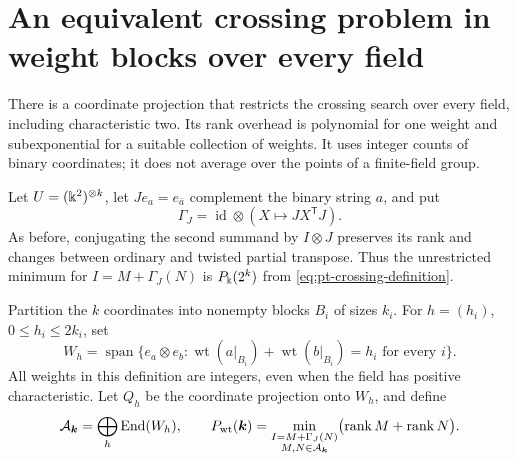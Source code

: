 \section{An equivalent crossing problem in weight blocks over every field}
\label{sec:weight-block-gate}

There is a coordinate projection that restricts the crossing search
over every field, including characteristic two. Its rank overhead is
polynomial for one weight and subexponential for a suitable collection
of weights. It uses integer counts of binary coordinates; it does not
average over the points of a finite-field group.

Let \(U=(\Bbbk^2)^{\otimes k}\), let \(J e_a=e_{\bar a}\) complement
the binary string \(a\), and put
\[
 \Gamma_J=\operatorname{id}\otimes(X\mapsto JX^{\mathsf T}J).
\]
As before, conjugating the second summand by \(I\otimes J\) preserves
its rank and changes between ordinary and twisted partial transpose.
Thus the unrestricted minimum for \(I=M+\Gamma_J(N)\) is
\(P_\Bbbk(2^k)\) from \eqref{eq:pt-crossing-definition}.

Partition the \(k\) coordinates into nonempty blocks \(B_i\) of sizes
\(k_i\). For \(h=(h_i)\), \(0\leq h_i\leq2k_i\), set
\[
 W_h=\operatorname{span}\{
 e_a\otimes e_b:
 \operatorname{wt}(a|_{B_i})+\operatorname{wt}(b|_{B_i})=h_i
 \text{ for every }i\}.
\]
All weights in this definition are integers, even when the field has
positive characteristic. Let \(Q_h\) be the coordinate projection onto
\(W_h\), and define
\[
 \mathcal A_{\boldsymbol k}
   =\bigoplus_h\operatorname{End}(W_h),\qquad
 P_{\rm wt}(\boldsymbol k)
   =\min_{\substack{I=M+\Gamma_J(N)\\
                    M,N\in\mathcal A_{\boldsymbol k}}}
      \bigl(\operatorname{rank}M+\operatorname{rank}N\bigr).
\]

